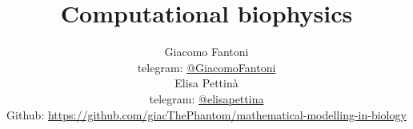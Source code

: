 

\title{\Huge\textbf{{Computational biophysics}}}

\author{
  Giacomo Fantoni \\
  \small telegram: \href{https://t.me/GiacomoFantoni}{@GiacomoFantoni} \\[3pt]
  Elisa Pettin\`a \\
  \small telegram: \href{https://t.me/elisapettina}{@elisapettina} \\[3pt]
  \small Github: \href{https://github.com/giacThePhantom/mathematical-modelling-in-biology}{https://github.com/giacThePhantom/mathematical-modelling-in-biology}\\
}




  \maketitle
  \tableofcontents
  
  
  
  
  
  
  
  
  
  
  
  
  
  
  
  
  
  
  
  


